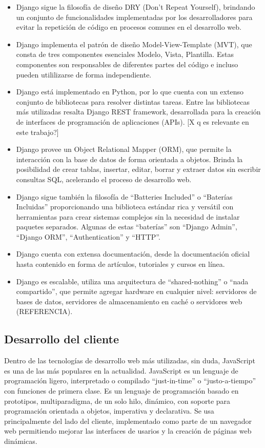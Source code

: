 \begin{itemize}
    \item Django sigue la filosofía
    de diseño DRY (Don't Repeat Yourself), brindando un conjunto de funcionalidades implementadas
    por los desarrolladores para evitar la repetición de código en procesos
    comunes en el desarrollo web.
    \item Django implementa el patrón de diseño Model-View-Template (MVT), que
    consta de tres componentes esenciales Modelo, Vista,
    Plantilla. Estas componentes son responsables de diferentes
    partes del código e incluso pueden utililizarse de forma independiente.
    \item Django está implementado en Python, por lo que cuenta con un 
    extenso conjunto de bibliotecas para resolver distintas tareas. Entre
    las bibliotecas más utilizadas resalta Django REST framework, desarrollada 
    para la creación de interfaces de programación de aplicaciones (APIs).
    [X q es relevante en este trabajo?]
    \item Django provee un Object Relational Mapper (ORM), 
    que permite la interacción con la base de datos
    de forma orientada a objetos. Brinda la posibilidad de crear tablas, insertar,
    editar, borrar y extraer datos sin escribir consultas SQL, acelerando el proceso
    de desarrollo web. 
    \item Django sigue también la filosofía de ``Batteries Included'' o ``Baterías Incluidas''
    proporcionando una biblioteca estándar rica y versátil con herramientas para
    crear sistemas complejos sin la necesidad de instalar paquetes separados. Algunas de 
    estas ``baterías'' son ``Django Admin'', ``Django ORM'', ``Authentication'' y
    ``HTTP''.
    \item Django cuenta con extensa documentación, desde la documentación oficial hasta 
    contenido en forma de artículos, tutoriales y cursos en línea.
    \item Django es escalable, utiliza una arquitectura de ``shared-nothing'' o ``nada compartido'',
    que permite agregar hardware en cualquier nivel: servidores de bases de datos,
    servidores de almacenamiento en caché o servidores web (REFERENCIA).

\end{itemize}

 


\subsection{Desarrollo del cliente}
Dentro de las tecnologías de desarrollo web más utilizadas, sin duda, 
JavaScript es una de las más populares en la actualidad. JavaScript es 
un lenguaje de programación ligero, interpretado o compilado ``just-in-time''
o ``justo-a-tiempo'' con funciones de primera clase. Es un lenguaje de programación
basado en prototipos, multiparadigma, de un solo hilo, dinámico, con
soporte para programación orientada a objetos, imperativa y declarativa.
Se usa principalmente del lado del cliente, implementado como parte de un navegador 
web permitiendo mejorar las interfaces de usarios y la creación de
páginas web dinámicas.

